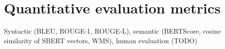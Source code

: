 \section{Quantitative evaluation metrics}
Syntactic (BLEU, ROUGE-1, ROUGE-L), semantic (BERTScore, cosine similarity of SBERT vectors, WMS), human evaluation (TODO)